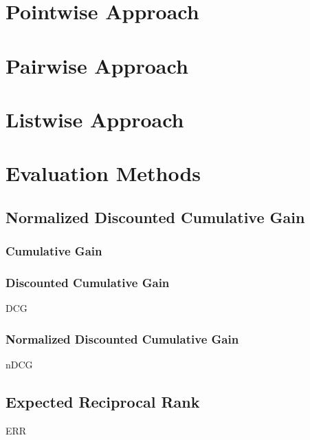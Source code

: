 \section{Pointwise Approach}

\section{Pairwise Approach}
\section{Listwise Approach}
\section{Evaluation Methods}
\subsection{Normalized Discounted Cumulative Gain}
\subsubsection{Cumulative Gain}
\subsubsection{Discounted Cumulative Gain}
\ac{DCG}
\subsubsection{Normalized Discounted Cumulative Gain}
\ac{nDCG}
\subsection{Expected Reciprocal Rank}
\ac{ERR}
